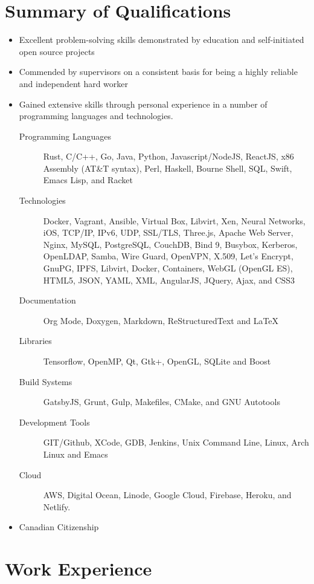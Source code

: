 \documentclass[11pt,letterpaper]{moderncv}
\begin{document}
\makecvtitle%

\section{Summary of Qualifications}

\begin{itemize}
\item Excellent problem-solving skills demonstrated by education
  and self-initiated open source projects
\item Commended by supervisors on a consistent basis for being a
  highly reliable and independent hard worker
\item Gained extensive skills through personal experience in a number
  of programming languages and technologies.
  \begin{description}
  \item[Programming Languages] Rust, C/C++, Go, Java, Python,
    Javascript/NodeJS, ReactJS, x86 Assembly (AT\&T syntax), Perl,
    Haskell, Bourne Shell, SQL, Swift, Emacs Lisp, and Racket
  \item[Technologies] Docker, Vagrant, Ansible, Virtual Box, Libvirt,
    Xen, Neural Networks, iOS, TCP/IP, IPv6, UDP, SSL/TLS, Three.js,
    Apache Web Server, Nginx, MySQL, PostgreSQL, CouchDB, Bind 9,
    Busybox, Kerberos, OpenLDAP, Samba, Wire Guard, OpenVPN, X.509,
    Let's Encrypt, GnuPG, IPFS, Libvirt, Docker, Containers, WebGL
    (OpenGL ES), HTML5, JSON, YAML, XML, AngularJS, JQuery, Ajax, and
    CSS3
  \item[Documentation] Org Mode, Doxygen, Markdown, ReStructuredText
    and \LaTeX{}
  \item[Libraries] Tensorflow, OpenMP, Qt, Gtk+, OpenGL, SQLite and
    Boost
  \item[Build Systems] GatsbyJS, Grunt, Gulp, Makefiles, CMake, and
    GNU Autotools
  \item[Development Tools] GIT/Github, XCode, GDB, Jenkins, Unix
    Command Line, Linux, Arch Linux and Emacs
  \item[Cloud] AWS, Digital Ocean, Linode, Google Cloud, Firebase,
    Heroku, and Netlify.
  \end{description}
\item Canadian Citizenship
\end{itemize}

\section{Work Experience}
\end{document}
